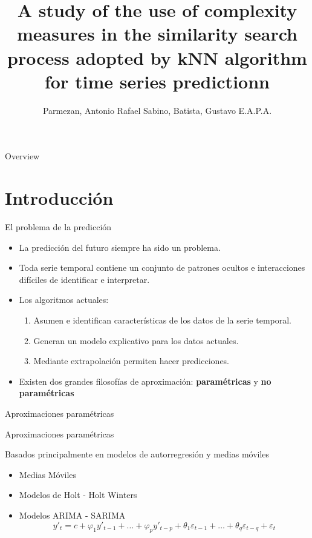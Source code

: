 \documentclass[12pt, aspectratio=169]{beamer} %
\title{A study of the use of complexity measures in the similarity search process adopted by kNN algorithm for time series predictionn}
\author{Parmezan, Antonio Rafael Sabino, Batista, Gustavo E.A.P.A.}
\begin{document}
\frame{\titlepage}


\begin{frame}{Overview}
\tableofcontents
\end{frame}

\section{Introducción}

\begin{frame}{El problema de la predicción}
  \begin{itemize}
  \item La predicción del futuro siempre ha sido un problema.
  \item Toda serie temporal contiene un conjunto de patrones ocultos e interacciones difíciles de identificar e interpretar.
  \item Los algoritmos actuales:
    \begin{enumerate}
    \item Asumen e identifican características de los datos de la serie temporal.
    \item Generan un modelo explicativo para los datos actuales.
    \item Mediante extrapolación permiten hacer predicciones.
    \end{enumerate}
  \item Existen dos grandes filosofías de aproximación: \textbf{paramétricas} y \textbf{no paramétricas}
  \end{itemize}
\end{frame}

\begin{frame}{Aproximaciones paramétricas}

  \begin{block}{Aproximaciones paramétricas}

    Basados principalmente en modelos de autorregresión y medias móviles

    \begin{itemize}
      \item Medias Móviles
      \item Modelos de Holt - Holt Winters
      \item Modelos ARIMA - SARIMA
        \[ y'_t = c + \varphi_1y'_{t-1} + \ldots + \varphi_py'_{t-p} +
          \theta_1\varepsilon_{t-1} + \ldots + \theta_q\varepsilon_{t-q} + \varepsilon_t\]
    \end{itemize}
  \end{block}
\end{frame}
\end{document}
